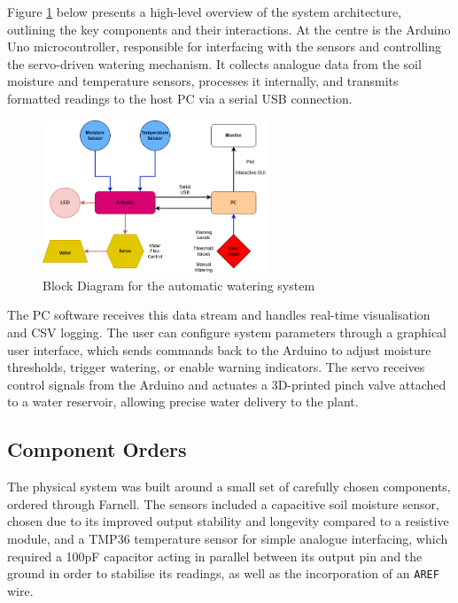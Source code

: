 \documentclass[a4paper,11pt]{article}
\begin{document}
Figure \ref{fig:Block_Diagram_for_the_automatic_watering_system} below presents a high-level overview 
of the system architecture, outlining the key components and their interactions. 
At the centre is the Arduino Uno microcontroller, responsible for interfacing with 
the sensors and controlling the servo-driven watering mechanism. 
It collects analogue data from the soil moisture and temperature sensors, 
processes it internally, and transmits formatted readings 
to the host PC via a serial USB connection.

\begin{figure}[H]
    \centering
    \includegraphics[width=0.6\textwidth]{Datalogger Block Diagram - final.png}
    \caption{Block Diagram for the automatic watering system}
    \label{fig:Block_Diagram_for_the_automatic_watering_system}
\end{figure}

The PC software receives this data stream and handles real-time visualisation
and CSV logging.
The user can configure system parameters through a graphical user interface, 
which sends commands back to the Arduino to adjust moisture thresholds, 
trigger watering, or enable warning indicators.
The servo receives control signals from the Arduino and 
actuates a 3D-printed pinch valve attached to a water reservoir, 
allowing precise water delivery to the plant. 

\subsection{Component Orders}
\label{sec:Components}
The physical system was built around a small set of carefully chosen components, 
ordered through Farnell. 
The sensors included a capacitive soil moisture sensor, 
chosen due to its improved output stability and longevity compared to a resistive module,
and a TMP36 temperature sensor for simple analogue interfacing, 
which required a 100pF capacitor acting in parallel between its output pin and the ground
in order to stabilise its readings, 
as well as the incorporation of an \texttt{AREF} wire.
\end{document}
